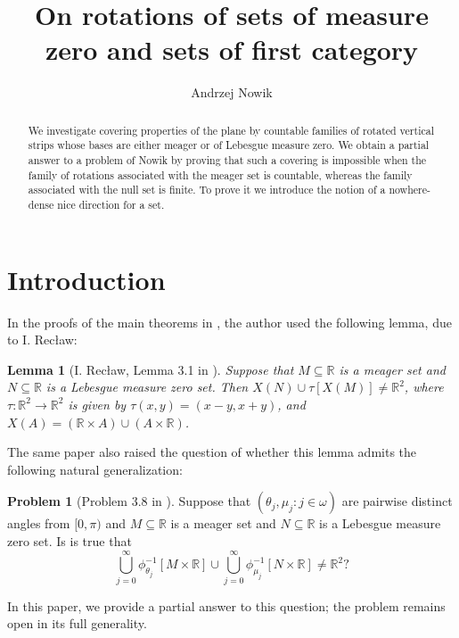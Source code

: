 \documentclass[12pt]{amsart}
\author{Andrzej Nowik}
\theoremstyle{plain}
\newtheorem{lemma}[theorem]{Lemma}
\theoremstyle{definition}
\newtheorem{Problem}[theorem]{Problem}
\theoremstyle{remark}
\newcommand{\real}{\mathbb{R}}
\begin{document}
\title[
On rotations of sets...
]{
On rotations of sets of measure zero and sets of first category
}

\begin{abstract}
  We investigate covering properties of the plane by countable families of rotated vertical strips
whose bases are either meager or of Lebesgue measure zero.
We obtain a partial answer to a problem of Nowik by proving that such a covering
is impossible when the family of rotations associated with the meager set is countable,
whereas the family associated with the null set is finite.
To prove it we introduce the notion of a nowhere-dense
nice direction for a set.
\end{abstract}

\maketitle
\section{Introduction}

In the proofs of the main theorems in \cite{Nowik2004},
the author used the following lemma, due to I. Rec\l{}aw:
\begin{lemma}[I. Rec\l{}aw, Lemma 3.1 in \cite{Nowik2004}]
Suppose that $M \subseteq \real$ is a meager set and
$N \subseteq \real$ is a Lebesgue measure zero set.
Then $X(N) \cup \tau[X(M)] \not= \real^2$,
where $\tau\colon\real^2\to\real^2$ is given by
$\tau(x,y) = (x - y, x + y)$,
and $X(A) = (\real\times A) \cup (A\times\real)$.
\end{lemma}
The same paper also raised the question of whether this lemma admits
the following natural generalization:
\begin{Problem}[Problem 3.8 in \cite{Nowik2004}]
  Suppose that $(\theta_j, \mu_j \colon j \in \omega)$ are
  pairwise distinct angles from $[0, \pi)$ and
$M \subseteq \real$ is a meager set and
$N \subseteq \real$ is a Lebesgue measure zero set.
Is is true that
\[
  \bigcup_{j=0}^\infty \phi_{\theta_j}^{-1}[M \times \real]
  \cup
  \bigcup_{j=0}^\infty \phi_{\mu_j}^{-1}[N \times \real]
  \not=\real^2?
\]
\end{Problem}

In this paper, we provide a partial answer to this question;
the problem remains open in its full generality.
\end{document}
